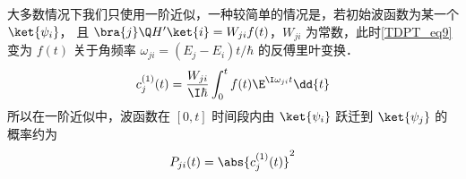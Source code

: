 大多数情况下我们只使用一阶近似，一种较简单的情况是，若初始波函数为某一个 $\ket{\psi_i}$， 且 $\bra{j}\Q H'\ket{i} = W_{ji}f(t)$，$W_{ji}$ 为常数，此时\autoref{TDPT_eq9} 变为 $f(t)$ 关于角频率 $\omega_{ji} = (E_j-E_i)t/\hbar$ 的反傅里叶变换．
\begin{equation}
c_j^{(1)}(t) = \frac{W_{ji}}{\I\hbar} \int_0^t f(t)\E^{\I\omega_{ji} t} \dd{t}
\end{equation}
所以在一阶近似中，波函数在 $[0,t]$ 时间段内由 $\ket{\psi_i}$ 跃迁到 $\ket{\psi_j}$ 的概率约为
\begin{equation}
P_{ji}(t) = \abs{c_j^{(1)}(t)}^2
\end{equation}
